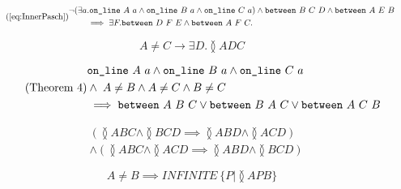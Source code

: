 \begin{equation}
  \tag{\ref{eq:InnerPasch}}
  \begin{split}
    &\Triangle{a}{A}{B}{C} \wedge \between{B}{C}{D} \wedge \between{A}{E}{B}\\ 
    &\qquad\implies \exists F. \between{D}{F}{E} \wedge \between{A}{F}{C}.
  \end{split}
\end{equation}

\begin{equation}\label{eq:three}\tag{Theorem~3}
A \neq C \rightarrow \exists D. \between{A}{D}{C}
\end{equation}

\begin{equation}\label{eq:four}\tag{Theorem~4}
  \begin{split}
    &\texttt{on\_line}\ A\ a \wedge \texttt{on\_line}\ B\ a \wedge \texttt{on\_line}\ C\ a \\
    &\wedge\; A \neq B \wedge A \neq C \wedge B \neq C\\
    &\implies \texttt{between}\ A\ B\ C \vee \texttt{between}\ B\ A\ C \vee \texttt{between}\ A\ C\ B
  \end{split}
\end{equation}

\begin{equation}\label{eq:five}\tag{Theorem~5}
  \begin{split}
    &(\between{A}{B}{C} \wedge \between{B}{C}{D} \implies \between{A}{B}{D} \wedge \between{A}{C}{D})\\
    &\wedge(\between{A}{B}{C} \wedge \between{A}{C}{D} \implies \between{A}{B}{D} \wedge \between{B}{C}{D})
  \end{split}
\end{equation}

\begin{equation}\label{eq:seven}\tag{Theorem~7}
  A \neq B \implies INFINITE\ \{ P \vert \between{A}{P}{B} \}
\end{equation}

